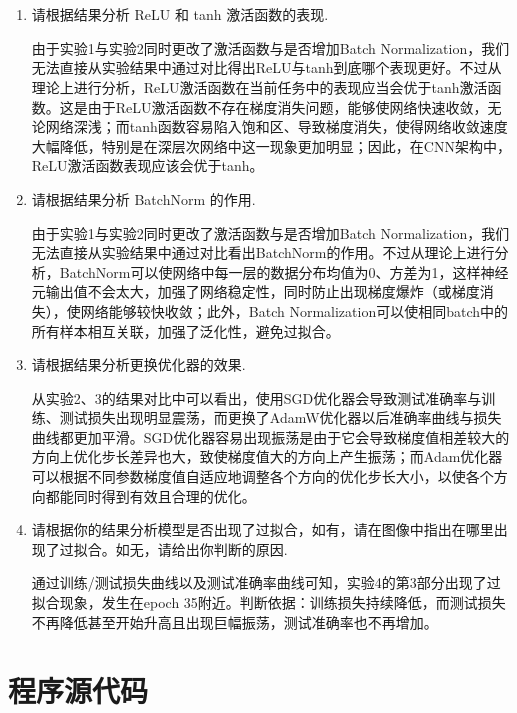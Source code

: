 \documentclass[11pt, a4paper]{article}
\begin{document}
\section{}
\begin{enumerate}
    \item 请根据结果分析 ReLU 和 tanh 激活函数的表现.
    
    由于实验1与实验2同时更改了激活函数与是否增加Batch Normalization，我们无法直接从实验结果中通过对比得出ReLU与tanh到底哪个表现更好。不过从理论上进行分析，ReLU激活函数在当前任务中的表现应当会优于tanh激活函数。这是由于ReLU激活函数不存在梯度消失问题，能够使网络快速收敛，无论网络深浅；而tanh函数容易陷入饱和区、导致梯度消失，使得网络收敛速度大幅降低，特别是在深层次网络中这一现象更加明显；因此，在CNN架构中，ReLU激活函数表现应该会优于tanh。

    \item 请根据结果分析 BatchNorm 的作用.
    
    由于实验1与实验2同时更改了激活函数与是否增加Batch Normalization，我们无法直接从实验结果中通过对比看出BatchNorm的作用。不过从理论上进行分析，BatchNorm可以使网络中每一层的数据分布均值为0、方差为1，这样神经元输出值不会太大，加强了网络稳定性，同时防止出现梯度爆炸（或梯度消失），使网络能够较快收敛；此外，Batch Normalization可以使相同batch中的所有样本相互关联，加强了泛化性，避免过拟合。

    \item 请根据结果分析更换优化器的效果.
    
    从实验2、3的结果对比中可以看出，使用SGD优化器会导致测试准确率与训练、测试损失出现明显震荡，而更换了AdamW优化器以后准确率曲线与损失曲线都更加平滑。SGD优化器容易出现振荡是由于它会导致梯度值相差较大的方向上优化步长差异也大，致使梯度值大的方向上产生振荡；而Adam优化器可以根据不同参数梯度值自适应地调整各个方向的优化步长大小，以使各个方向都能同时得到有效且合理的优化。

    \item 请根据你的结果分析模型是否出现了过拟合，如有，请在图像中指出在哪里出现了过拟合。如无，请给出你判断的原因.
    
    通过训练/测试损失曲线以及测试准确率曲线可知，实验4的第3部分出现了过拟合现象，发生在epoch 35附近。判断依据：训练损失持续降低，而测试损失不再降低甚至开始升高且出现巨幅振荡，测试准确率也不再增加。
\end{enumerate}

\section*{程序源代码}

\end{document}
